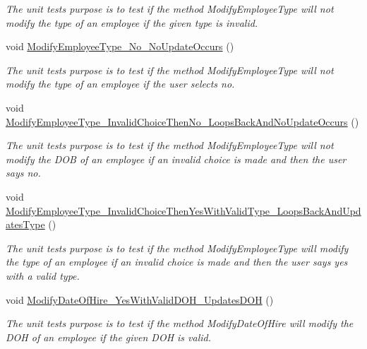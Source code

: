 \begin{DoxyCompactItemize}
\begin{DoxyCompactList}\small\item\em The unit test\textquotesingle{}s purpose is to test if the method Modify\+Employee\+Type will not modify the type of an employee if the given type is invalid. \end{DoxyCompactList}\item 
void \hyperlink{class_the_company_1_1_tests_1_1_modify_employee_tests_a791b6e90e3029359d0ef68d07257f69f}{Modify\+Employee\+Type\+\_\+\+No\+\_\+\+No\+Update\+Occurs} ()
\begin{DoxyCompactList}\small\item\em The unit test\textquotesingle{}s purpose is to test if the method Modify\+Employee\+Type will not modify the type of an employee if the user selects no. \end{DoxyCompactList}\item 
void \hyperlink{class_the_company_1_1_tests_1_1_modify_employee_tests_a83794fc97559ce3a9ffc11a0e2809f32}{Modify\+Employee\+Type\+\_\+\+Invalid\+Choice\+Then\+No\+\_\+\+Loops\+Back\+And\+No\+Update\+Occurs} ()
\begin{DoxyCompactList}\small\item\em The unit test\textquotesingle{}s purpose is to test if the method Modify\+Employee\+Type will not modify the D\+O\+B of an employee if an invalid choice is made and then the user says no. \end{DoxyCompactList}\item 
void \hyperlink{class_the_company_1_1_tests_1_1_modify_employee_tests_adeb0c0cc539e528c6418f91ef5bb572a}{Modify\+Employee\+Type\+\_\+\+Invalid\+Choice\+Then\+Yes\+With\+Valid\+Type\+\_\+\+Loops\+Back\+And\+Updates\+Type} ()
\begin{DoxyCompactList}\small\item\em The unit test\textquotesingle{}s purpose is to test if the method Modify\+Employee\+Type will modify the type of an employee if an invalid choice is made and then the user says yes with a valid type. \end{DoxyCompactList}\item 
void \hyperlink{class_the_company_1_1_tests_1_1_modify_employee_tests_abdc4f346c09889bbe04f1b4eddc0ce40}{Modify\+Date\+Of\+Hire\+\_\+\+Yes\+With\+Valid\+D\+O\+H\+\_\+\+Updates\+D\+O\+H} ()
\begin{DoxyCompactList}\small\item\em The unit test\textquotesingle{}s purpose is to test if the method Modify\+Date\+Of\+Hire will modify the D\+O\+H of an employee if the given D\+O\+H is valid. \end{DoxyCompactList}\item 

\end{DoxyCompactItemize}
